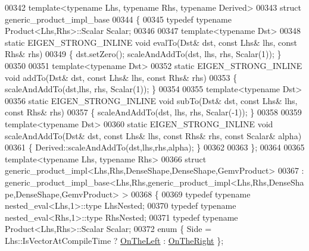 \begin{DoxyCode}
00342 \textcolor{keyword}{template}<\textcolor{keyword}{typename} Lhs, \textcolor{keyword}{typename} Rhs, \textcolor{keyword}{typename} Derived>
00343 \textcolor{keyword}{struct }generic\_product\_impl\_base
00344 \{
00345   \textcolor{keyword}{typedef} \textcolor{keyword}{typename} Product<Lhs,Rhs>::Scalar Scalar;
00346   
00347   \textcolor{keyword}{template}<\textcolor{keyword}{typename} Dst>
00348   \textcolor{keyword}{static} EIGEN\_STRONG\_INLINE \textcolor{keywordtype}{void} evalTo(Dst& dst, \textcolor{keyword}{const} Lhs& lhs, \textcolor{keyword}{const} Rhs& rhs)
00349   \{ dst.setZero(); scaleAndAddTo(dst, lhs, rhs, Scalar(1)); \}
00350 
00351   \textcolor{keyword}{template}<\textcolor{keyword}{typename} Dst>
00352   \textcolor{keyword}{static} EIGEN\_STRONG\_INLINE \textcolor{keywordtype}{void} addTo(Dst& dst, \textcolor{keyword}{const} Lhs& lhs, \textcolor{keyword}{const} Rhs& rhs)
00353   \{ scaleAndAddTo(dst,lhs, rhs, Scalar(1)); \}
00354 
00355   \textcolor{keyword}{template}<\textcolor{keyword}{typename} Dst>
00356   \textcolor{keyword}{static} EIGEN\_STRONG\_INLINE \textcolor{keywordtype}{void} subTo(Dst& dst, \textcolor{keyword}{const} Lhs& lhs, \textcolor{keyword}{const} Rhs& rhs)
00357   \{ scaleAndAddTo(dst, lhs, rhs, Scalar(-1)); \}
00358   
00359   \textcolor{keyword}{template}<\textcolor{keyword}{typename} Dst>
00360   \textcolor{keyword}{static} EIGEN\_STRONG\_INLINE \textcolor{keywordtype}{void} scaleAndAddTo(Dst& dst, \textcolor{keyword}{const} Lhs& lhs, \textcolor{keyword}{const} Rhs& rhs, \textcolor{keyword}{const} Scalar& 
      alpha)
00361   \{ Derived::scaleAndAddTo(dst,lhs,rhs,alpha); \}
00362 
00363 \};
00364 
00365 \textcolor{keyword}{template}<\textcolor{keyword}{typename} Lhs, \textcolor{keyword}{typename} Rhs>
00366 \textcolor{keyword}{struct }generic\_product\_impl<Lhs,Rhs,DenseShape,DenseShape,GemvProduct>
00367   : generic\_product\_impl\_base<Lhs,Rhs,generic\_product\_impl<Lhs,Rhs,DenseShape,DenseShape,GemvProduct> >
00368 \{
00369   \textcolor{keyword}{typedef} \textcolor{keyword}{typename} nested\_eval<Lhs,1>::type LhsNested;
00370   \textcolor{keyword}{typedef} \textcolor{keyword}{typename} nested\_eval<Rhs,1>::type RhsNested;
00371   \textcolor{keyword}{typedef} \textcolor{keyword}{typename} Product<Lhs,Rhs>::Scalar Scalar;
00372   \textcolor{keyword}{enum} \{ Side = Lhs::IsVectorAtCompileTime ? \hyperlink{group__enums_ggac22de43beeac7a78b384f99bed5cee0ba129609b3bdf23b071f5f86cf2f995ec4}{OnTheLeft} : \hyperlink{group__enums_ggac22de43beeac7a78b384f99bed5cee0ba99dc75d8e00b6c3a5bdc31940f47492b}{OnTheRight} \};

\end{DoxyCode}
